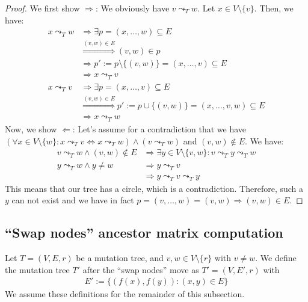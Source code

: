 \begin{proof}
    We first show $\Rightarrow$: We obviously have $v \leadsto_T w$. Let $x \in V \setminus \{v\}$. Then, we have:
    \begin{align*}
        x \leadsto_T w  &\Rightarrow \exists p = (x, \dots, w) \subseteq E \\
                        &\stackrel{(v, w) \in E}{\Rightarrow} (v, w) \in p \\
                        &\Rightarrow p' := p \setminus \{(v, w)\} = (x, \dots, v) \subseteq E \\
                        &\Rightarrow x \leadsto_T v \\
        x \leadsto_T v  &\Rightarrow \exists p = (x, \dots, v) \subseteq E \\
                        &\stackrel{(v, w) \in E}{\Rightarrow} p' := p \cup \{(v, w)\} = (x, \dots, v, w) \subseteq E \\
                        &\Rightarrow x \leadsto_T w
    \end{align*}
    Now, we show $\Leftarrow$: Let's assume for a contradiction that we have $(\forall x \in V \setminus \{w\}: x \leadsto_T v \Leftrightarrow x \leadsto_T w) \wedge (v \leadsto_T w)$ and $(v, w) \notin E$. We have:
    \begin{align*}
        v \leadsto_T w \wedge (v, w) \notin E &\Rightarrow \exists y \in V \setminus \{v, w\}: v \leadsto_T y \leadsto_T w \\
        y \leadsto_T w \wedge y \neq w &\Rightarrow y \leadsto_T v \\
        &\Rightarrow y \leadsto_T v \leadsto_T y
    \end{align*}
    This means that our tree has a circle, which is a contradiction. Therefore, such a $y$ can not exist and we have in fact $p = (v, \dots, w) = (v, w) \Rightarrow (v, w) \in E$.
\end{proof}

\subsection{``Swap nodes'' ancestor matrix computation}

\begin{definition}
    \label{def:swap_nodes}
    Let $T = (V, E, r)$ be a mutation tree, and $v, w \in V \setminus \{r\}$ with $v \neq w$. We define the mutation tree $T'$ after the ``swap nodes'' move as $T' = (V, E', r)$ with
    \begin{align*}
        E' := \{(f(x), f(y)) : (x, y) \in E\}
    \end{align*}
    We assume these definitions for the remainder of this subsection.
\end{definition}

